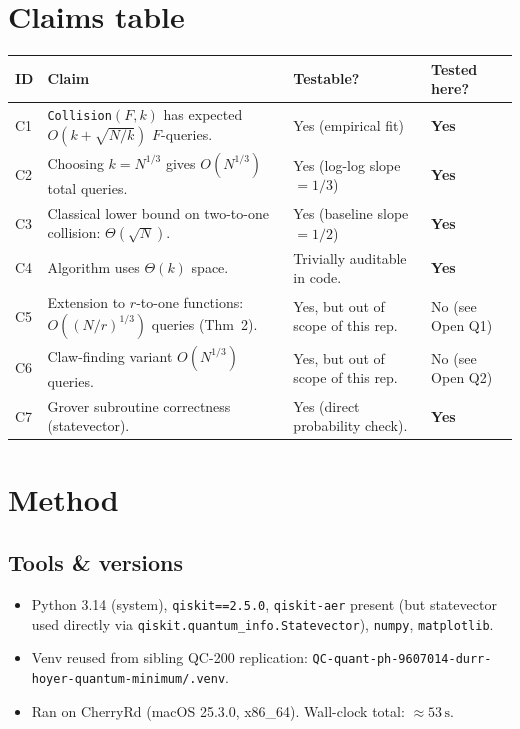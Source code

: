 \documentclass[11pt]{article}
\begin{document}
\section{Claims table}
\begin{center}
\begin{tabular}{@{}llll@{}}
\toprule
ID & Claim & Testable? & Tested here? \\
\midrule
C1 & \texttt{Collision}$(F,k)$ has expected $O(k + \sqrt{N/k})$ $F$-queries. & Yes (empirical fit) & \textbf{Yes} \\
C2 & Choosing $k = N^{1/3}$ gives $O(N^{1/3})$ total queries. & Yes (log-log slope $=1/3$) & \textbf{Yes} \\
C3 & Classical lower bound on two-to-one collision: $\Theta(\sqrt{N})$. & Yes (baseline slope $= 1/2$) & \textbf{Yes} \\
C4 & Algorithm uses $\Theta(k)$ space. & Trivially auditable in code. & \textbf{Yes} \\
C5 & Extension to $r$-to-one functions: $O((N/r)^{1/3})$ queries (Thm~2). & Yes, but out of scope of this rep. & No (see Open Q1) \\
C6 & Claw-finding variant $O(N^{1/3})$ queries. & Yes, but out of scope of this rep. & No (see Open Q2) \\
C7 & Grover subroutine correctness (statevector). & Yes (direct probability check). & \textbf{Yes} \\
\bottomrule
\end{tabular}
\end{center}

\section{Method}
\subsection{Tools \& versions}
\begin{itemize}
  \item Python 3.14 (system), \texttt{qiskit==2.5.0}, \texttt{qiskit-aer} present
        (but statevector used directly via \texttt{qiskit.quantum\_info.Statevector}),
        \texttt{numpy}, \texttt{matplotlib}.
  \item Venv reused from sibling QC-200 replication:
        \verb|QC-quant-ph-9607014-durr-hoyer-quantum-minimum/.venv|.
  \item Ran on CherryRd (macOS 25.3.0, x86\_64). Wall-clock total: $\approx 53\,\text{s}$.
\end{itemize}
\end{document}
